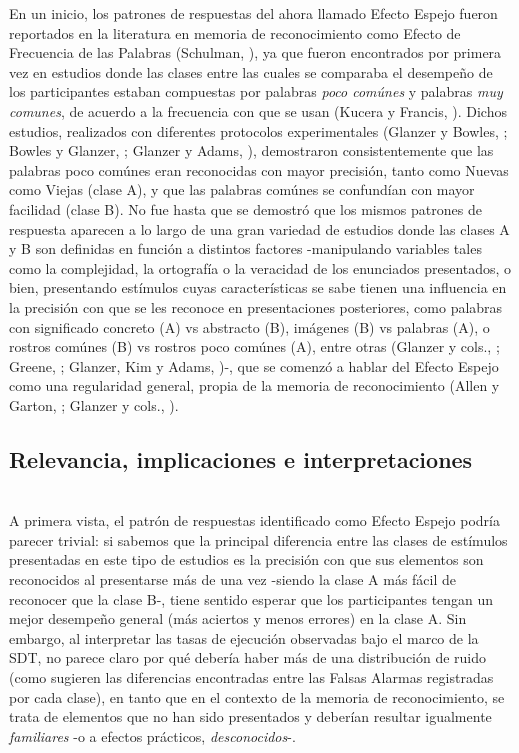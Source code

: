En un inicio, los patrones de respuestas del ahora llamado Efecto Espejo fueron reportados en la literatura en memoria de reconocimiento como Efecto de Frecuencia de las Palabras (Schulman, \citeyear{Schulman1967}), ya que fueron encontrados por primera vez en estudios donde las clases entre las cuales se comparaba el desempeño de los participantes estaban compuestas por palabras \textit{poco comúnes} y palabras \textit{muy comunes}, de acuerdo a la frecuencia con que se usan (Kucera y Francis, \citeyear{Kucera1967}). Dichos estudios, realizados con diferentes protocolos experimentales (Glanzer y Bowles, \citeyear{Glanzer1976}; Bowles y Glanzer, \citeyear{Bowles1983}; Glanzer y Adams, \citeyear{Glanzer1990}), demostraron consistentemente que las palabras poco comúnes eran reconocidas con mayor precisión, tanto como Nuevas como Viejas (clase A), y que las palabras comúnes se confundían con mayor facilidad (clase B). No fue hasta que se demostró que los mismos patrones de respuesta aparecen a lo largo de una gran variedad de estudios donde las clases A y B son definidas en función a distintos factores -manipulando variables tales como la complejidad, la ortografía o la veracidad de los enunciados presentados, o bien, presentando estímulos cuyas características se sabe tienen una influencia en la precisión con que se les reconoce en presentaciones posteriores, como palabras con significado concreto (A) vs abstracto (B), imágenes (B) vs palabras (A), o rostros comúnes (B) vs rostros poco comúnes (A), entre otras (Glanzer y cols., \citeyear{Glanzer1993}; Greene, \citeyear{Greene1996}; Glanzer, Kim y Adams, \citeyear{Glanzer1998})-, que se comenzó a hablar del Efecto Espejo como una regularidad general, propia de la memoria de reconocimiento (Allen y Garton, \citeyear{Allen1968}; Glanzer y cols., \citeyear{Glanzer1993}).

\subsection{Relevancia, implicaciones e interpretaciones}\\

A primera vista, el patrón de respuestas identificado como Efecto Espejo podría parecer trivial: si sabemos que la principal diferencia entre las clases de estímulos presentadas en este tipo de estudios es la precisión con que sus elementos son reconocidos al presentarse más de una vez -siendo la clase A más fácil de reconocer que la clase B-, tiene sentido esperar que los participantes tengan un mejor desempeño general (más aciertos y menos errores) en la clase A. Sin embargo, al interpretar las tasas de ejecución observadas bajo el marco de la SDT, no parece claro por qué debería haber más de una distribución de ruido (como sugieren las diferencias encontradas entre las Falsas Alarmas registradas por cada clase), en tanto que en el contexto de la memoria de reconocimiento, se trata de elementos que no han sido presentados y deberían resultar igualmente \textit{familiares} -o a efectos prácticos, \textit{desconocidos}-.\\

